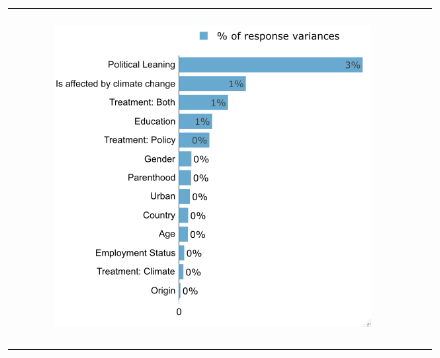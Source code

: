 \documentclass{article}
\begin{document}
\begin{figure}[h!]
\begin{center}
\begin{tabular}{cc}
\begin{subfigure}{0.5\textwidth}
			\includegraphics[width=\textwidth]{lmg_tax_transfers_socio_non_standardized}
		\end{subfigure}\\
	\end{tabular}


\end{center}
\end{figure}
\end{document}
